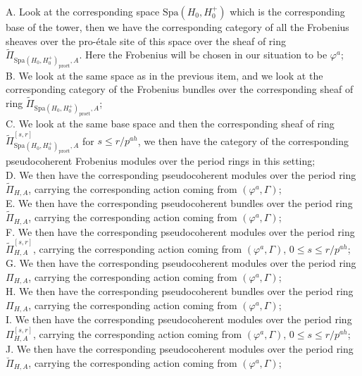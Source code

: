 \documentclass[12pt]{amsart}
\theoremstyle{definition}
\numberwithin{equation}{section}
\begin{document}
\noindent A. Look at the corresponding space $\mathrm{Spa}(H_0,H_0^+)$ which is the corresponding base of the tower, then we have the corresponding category of all the Frobenius sheaves over the pro-\'etale site of this space over the sheaf of ring $\widetilde{\Pi}_{\mathrm{Spa}(H_0,H_0^+)_\text{pro\'et},A}$. Here the Frobenius will be chosen in our situation to be $\varphi^a$;\\
\noindent B. We look at the same space as in the previous item, and we look at the corresponding category of the Frobenius bundles over the corresponding sheaf of ring $\widetilde{\Pi}_{\mathrm{Spa}(H_0,H_0^+)_\text{pro\'et},A}$;\\
\noindent C. We look at the same base space and then the corresponding sheaf of ring $\widetilde{\Pi}^{[s,r]}_{\mathrm{Spa}(H_0,H_0^+)_\text{pro\'et},A}$ for $s\leq r/p^{ah}$, we then have the category of the corresponding pseudocoherent Frobenius modules over the period rings in this setting;\\
\noindent D. We then have the corresponding pseudocoherent modules over the period ring ${\widetilde{\Pi}}_{H,A}$, carrying the corresponding action coming from $(\varphi^a,\Gamma)$;\\
\noindent E. We then have the corresponding pseudocoherent bundles over the period ring ${\widetilde{\Pi}}_{H,A}$, carrying the corresponding action coming from $(\varphi^a,\Gamma)$;\\
\noindent F. We then have the corresponding pseudocoherent modules over the period ring ${\widetilde{\Pi}}^{[s,r]}_{H,A}$, carrying the corresponding action coming from $(\varphi^a,\Gamma)$, $0\leq s\leq r/p^{ah}$;\\
\noindent G. We then have the corresponding pseudocoherent modules over the period ring ${{\Pi}}_{H,A}$, carrying the corresponding action coming from $(\varphi^a,\Gamma)$;\\
\noindent H. We then have the corresponding pseudocoherent bundles over the period ring ${{\Pi}}_{H,A}$, carrying the corresponding action coming from $(\varphi^a,\Gamma)$;\\
\noindent I. We then have the corresponding pseudocoherent modules over the period ring ${{\Pi}}^{[s,r]}_{H,A}$, carrying the corresponding action coming from $(\varphi^a,\Gamma)$, $0\leq s\leq r/p^{ah}$;\\
\noindent J. We then have the corresponding pseudocoherent modules over the period ring ${\breve{\Pi}}_{H,A}$, carrying the corresponding action coming from $(\varphi^a,\Gamma)$;\\
\end{document}
